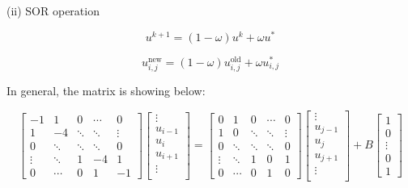 \documentclass[12pt]{article}
\begin{document}
(ii) SOR operation

\begin{equation*}
u^{k+1} = (1-\omega)u^k + \omega u^{*}
\end{equation*}

\begin{equation*}
u_{i,j}^{\text{new}} = (1-\omega)u_{i,j}^{\text{old}} + \omega u_{i,j}^{*}
\end{equation*}











In general, the matrix is showing below:





\[
\begin{bmatrix}
    -1 & 1 & 0 & \cdots & 0 \\
    1  & -4 & \ddots & \ddots & \vdots \\
    0 & \ddots & \ddots & \ddots & 0 \\
    \vdots & \ddots & 1 & -4 & 1 \\
    0 & \cdots & 0 & 1 & -1
\end{bmatrix}
\begin{bmatrix}
    \vdots \\
    u_{i-1} \\
    u_i \\
    u_{i+1}\\
    \vdots \\
    
\end{bmatrix}
=
\begin{bmatrix}
    0 & 1 & 0 & \cdots & 0 \\
    1  & 0 & \ddots & \ddots & \vdots \\
    0 & \ddots & \ddots & \ddots & 0 \\
    \vdots & \ddots & 1 & 0 & 1 \\
    0 & \cdots & 0 & 1 & 0
\end{bmatrix}
\begin{bmatrix}
    \vdots \\
    u_{j-1} \\
    u_j \\
    u_{j+1}\\
    \vdots \\
    
\end{bmatrix}
+
B
\begin{bmatrix}
    1 \\
    0 \\
    \vdots \\
    0 \\
    1
\end{bmatrix}
\]
\end{document}
